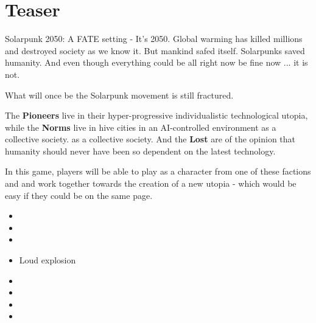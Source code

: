 \section{Teaser}

Solarpunk 2050: A FATE setting - It's 2050. Global warming has
killed millions and destroyed society as we know it. But mankind safed itself. Solarpunks saved humanity. And even though everything could be all right now
be fine now ... it is not.

What will once be the Solarpunk movement is still fractured.

The \textbf{Pioneers} live in their hyper-progressive individualistic technological
utopia, while the  \textbf{Norms} live in hive cities in an AI-controlled environment as a collective society.
as a collective society. And the \textbf{Lost} are of the opinion that humanity should never have been so dependent on the latest technology.

In this game, players will be able to play as a character from one of these factions and
and work together towards the creation of a new utopia - which would be easy if they could be on the same page.

\begin{normtalk}[title=the Mission]
    \begin{itemize}
        \item {}
        \item {}
        \item {}
        \item Loud explosion
        \item {}
        \item {}
        \item {}
        \item {}
    \end{itemize}
\end{normtalk}